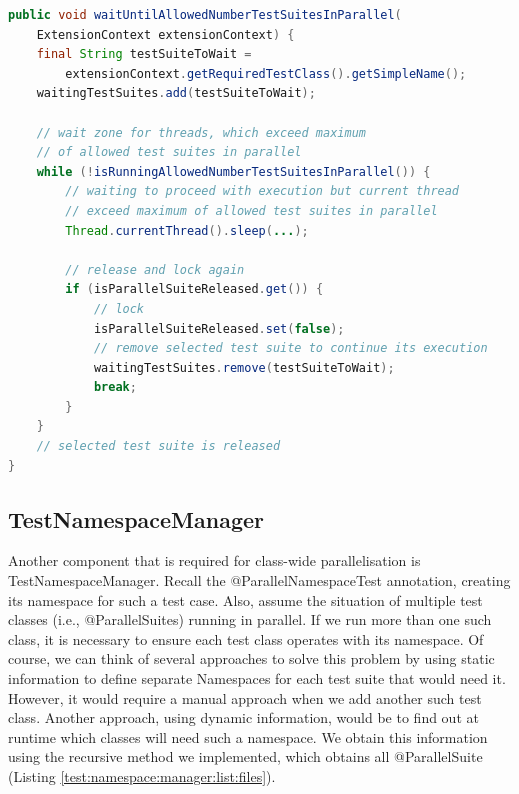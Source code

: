 \begin{lstlisting}[language=Java,label=parallel:suite:sync,caption=Additional synchronization for multiple @ParallelSuite\, that exceed our configured parallelism limit and are spawned by ForkJoinPool,frame=tb]
public void waitUntilAllowedNumberTestSuitesInParallel(
    ExtensionContext extensionContext) {
    final String testSuiteToWait =
        extensionContext.getRequiredTestClass().getSimpleName();
    waitingTestSuites.add(testSuiteToWait);

    // wait zone for threads, which exceed maximum
    // of allowed test suites in parallel
    while (!isRunningAllowedNumberTestSuitesInParallel()) {
        // waiting to proceed with execution but current thread
        // exceed maximum of allowed test suites in parallel
        Thread.currentThread().sleep(...);

        // release and lock again
        if (isParallelSuiteReleased.get()) {
            // lock
            isParallelSuiteReleased.set(false);
            // remove selected test suite to continue its execution
            waitingTestSuites.remove(testSuiteToWait);
            break;
        }
    }
    // selected test suite is released
}
\end{lstlisting}

\subsection{TestNamespaceManager}
\label{05:class:wide:test:namespace:manager}

Another component that is required for class-wide parallelisation is TestNamespaceManager.
Recall the @ParallelNamespaceTest annotation, creating its namespace for such a test case.
Also, assume the situation of multiple test classes (i.e., @ParallelSuites) running in parallel.
If we run more than one such class, it is necessary to ensure each test class operates with its namespace.
Of course, we can think of several approaches to solve this problem by using static information to define separate Namespaces
for each test suite that would need it. However, it would require a manual approach when we add another such test class.
Another approach, using dynamic information, would be to find out at runtime which classes will need such a namespace.
We obtain this information using the recursive method we implemented, which obtains all @ParallelSuite (Listing \ref{test:namespace:manager:list:files}).

